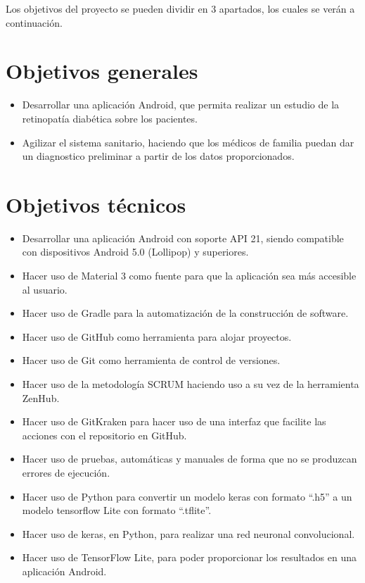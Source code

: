 
Los objetivos del proyecto se pueden dividir en 3 apartados, los cuales se verán a continuación. 
\section{Objetivos generales}
\begin{itemize}
    \item Desarrollar una aplicación Android, que permita realizar un estudio de la retinopatía diabética sobre los pacientes.
    \item Agilizar el sistema sanitario, haciendo que los médicos de familia puedan dar un diagnostico preliminar a partir de los datos proporcionados.

\end{itemize}
\section{Objetivos técnicos}
\begin{itemize}
    \item Desarrollar una aplicación Android con soporte API 21, siendo compatible con dispositivos Android 5.0 (Lollipop) y superiores.
    \item Hacer uso de Material 3 como fuente para que la aplicación sea más accesible al usuario.
    \item Hacer uso de Gradle para la automatización de la construcción de software.
    \item Hacer uso de GitHub como herramienta para alojar proyectos.
    \item Hacer uso de Git como herramienta de control de versiones.
    \item Hacer uso de la metodología SCRUM haciendo uso a su vez de la herramienta ZenHub.
    \item Hacer uso de GitKraken para hacer uso de una interfaz que facilite las acciones con el repositorio en GitHub.
    \item Hacer uso de pruebas, automáticas y manuales de forma que no se produzcan errores de ejecución.
    \item Hacer uso de Python para convertir un modelo keras con formato ``.h5'' a un modelo tensorflow Lite con formato ``.tflite''.
    \item Hacer uso de keras, en Python, para realizar una red neuronal convolucional.
    \item Hacer uso de TensorFlow Lite, para poder proporcionar los resultados en una aplicación Android.
    
\end{itemize}
